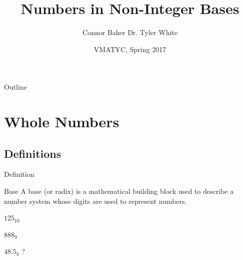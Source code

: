 \documentclass{beamer}
\title{Numbers in Non-Integer Bases}
\author[Connor Baker]{Connor Baker \qquad Dr. Tyler White}
\institute[NVCC]{Northern Virginia Community College} %
\date{VMATYC, Spring 2017}
\begin{document}
\begin{frame}
  \titlepage
\end{frame}

\begin{frame}{Outline}
  \tableofcontents
\end{frame}










\section{Whole Numbers}










\subsection{Definitions}
\begin{frame}{Definition}
  \begin{block}{Base}
    A base (or radix) is a mathematical building block used to describe a number system whose digits are used to represent numbers.
  \end{block}\pause

  \begin{example}\pause
    $125_{10}$ \pause

    $888_9$ \pause

    $48.5_8$ \pause ?
  \end{example}
\end{frame}
\end{document}
